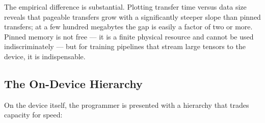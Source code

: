 \documentclass[11pt,a4paper]{article}
\theoremstyle{definition}
\theoremstyle{remark}
\theoremstyle{plain}
\begin{document}
\begin{center}
\end{center}

The empirical difference is substantial. Plotting transfer time
versus data size reveals that pageable transfers grow with a
significantly steeper slope than pinned transfers; at a few hundred
megabytes the gap is easily a factor of two or more. Pinned memory
is not free --- it is a finite physical resource and cannot be used
indiscriminately --- but for training pipelines that stream large
tensors to the device, it is indispensable.

\subsection{The On-Device Hierarchy}

On the device itself, the programmer is presented with a hierarchy
that trades capacity for speed:
\end{document}

